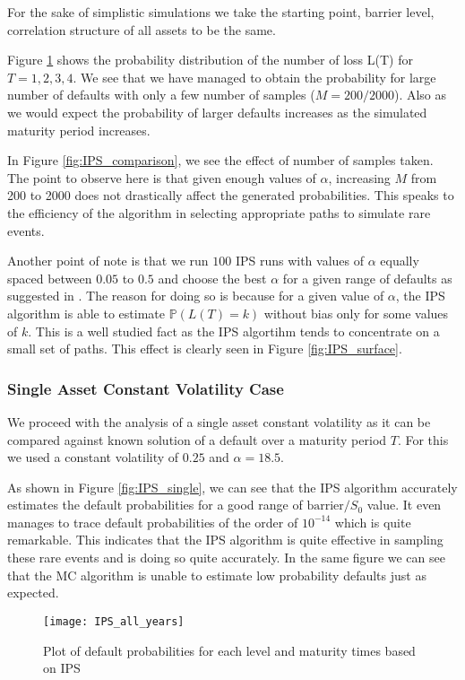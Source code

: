 For the sake of simplistic simulations we take the starting point, barrier
level, correlation structure of all assets to be the same.

Figure \ref{fig:IPS_all} shows the probability distribution of the number of
loss L(T) for $T = 1, 2, 3, 4$. We see that we have managed to obtain the
probability for large number of defaults with only a few number of samples ($M =
200/2000$). Also as we would expect the probability of larger defaults increases
as the simulated maturity period increases.

In Figure \ref{fig:IPS_comparison}, we see the effect of number of samples
taken. The point to observe here is that given enough values of $\alpha$, 
increasing $M$ from 200 to 2000 does not drastically affect the generated
probabilities. This speaks to the efficiency of the algorithm in selecting
appropriate paths to simulate rare events.

Another point of note is that we run $100$ IPS runs with values of $\alpha$
equally spaced between $0.05$ to $0.5$ and choose the best $\alpha$ for a given
range of defaults as suggested in \cite{carmona2009importance}. The reason for 
doing so is because for a given value of $\alpha$, the IPS algorithm is able to 
estimate $\mathbb{P}(L(T) = k)$ without bias only for some values of $k$. This
is a well studied fact as the IPS algortihm tends to concentrate on a small set
of paths. This effect is clearly seen in Figure \ref{fig:IPS_surface}.

\subsubsection{Single Asset Constant Volatility Case}
We proceed with the analysis of a single asset constant volatility as it can be
compared against known solution of a default over a maturity period $T$. For
this we used a constant volatility of $0.25$ and $\alpha = 18.5$.

As shown in Figure \ref{fig:IPS_single},  we can see that the IPS algorithm
accurately estimates the default probabilities for a good range of
$\text{barrier}/S_0$ value. It even manages to trace default probabilities of the 
order of $10^{-14}$ which is quite remarkable. This indicates that the IPS
algorithm is quite effective in sampling these rare events and is doing so quite
accurately. In the same figure we can see that the MC algorithm is unable to
estimate low probability defaults just as expected.

\begin{figure}
	\centering
	\texttt{[image: IPS\_all\_years]}
	\caption{Plot of default probabilities for each level and maturity times
	based on IPS}
	\label{fig:IPS_all}
\end{figure}

